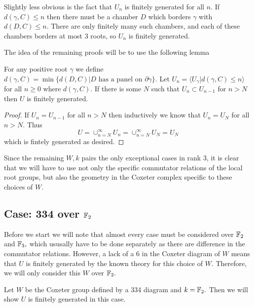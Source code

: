 \documentclass[class=book, crop=false]{standalone}
\begin{document}
Slightly less obvious is the fact that $U_n$ is finitely generated for all $n.$ If $d(\gamma,C)\le n$ then there must be a chamber $D$ which borders $\gamma$ with $d(D,C)\le n.$ There are only finitely many such chambers, and each of these chambers borders at most 3 roots, so $U_n$ is finitely generated.

The idea of the remaining proofs will be to use the following lemma
\begin{lemma} 
	For any positive root $\gamma$ we define $d(\gamma,C)=\min\{d(D,C)|D\text{ has a panel on }\partial \gamma\}.$ Let $U_n=\langle U_\gamma |d(\gamma,C)\le n\rangle$ for all $n\ge 0$ where $d(\gamma,C).$ If there is some $N$ such that $U_n\subset U_{n-1}$ for $n>N$ then $U$ is finitely generated.
	\label{fgcond}
\end{lemma}
\begin{proof}
	If $U_n=U_{n-1}$ for all $n> N$ then inductively we know that $U_n=U_N$ for all $n>N.$ Thus
	\[
		U=\cup_{n=N}^{\infty}{U_n}=\cup_{n=N}^\infty U_N=U_N
	\]
	which is fintely generated as desired.
\end{proof}

Since the remaining $W,k$ pairs the only exceptional cases in rank 3, it is clear that we will have to use not only the specific commutator relations of the local root groups, but also the geometry in the Coxeter complex specific to these choices of $W.$

\subsection{Case: 334 over $\mathbb{F}_{2}$}
Before we start we will note that almost every case must be considered over $\mathbb{F}_{2}$ and $\mathbb{F}_{3},$ which ususally have to be done separately as there are difference in the commutator relations. However, a lack of a $6$ in the Coxeter diagram of $W$ means that $U$ is finitely generated by the known theory for this choice of $W.$ Therefore, we will only consider this $W$ over $\mathbb{F}_{2}.$

Let $W$ be the Coxeter group defined by a 334 diagram and $k=\mathbb{F}_{2}.$ Then we will show $U$ is finitely generated in this case.
\end{document}
